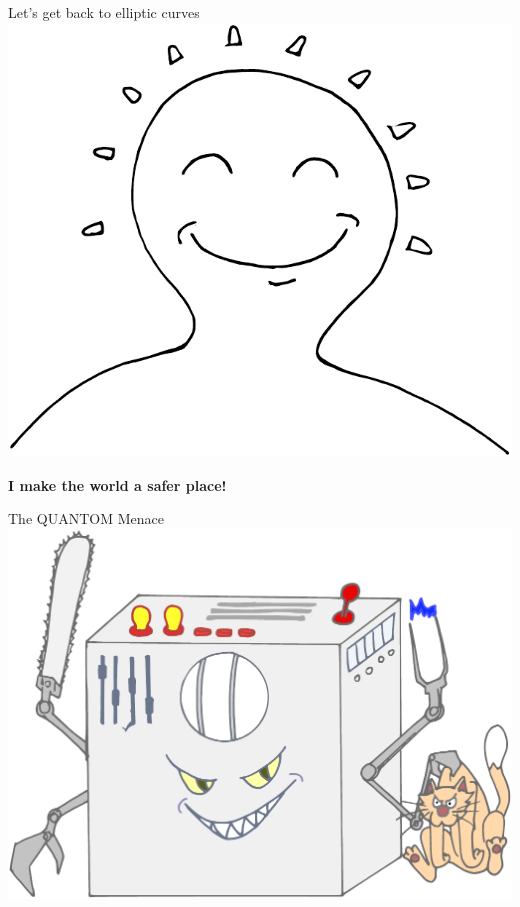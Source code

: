 \documentclass{beamer}
\begin{document}

\begin{frame}{Let's get back to elliptic curves}
  \centering
  \includegraphics[height=0.7\textheight]{ec-happy}
  
  \Large\bf  I make the world a safer place!
\end{frame}


\begin{frame}{The QUANTOM Menace}
  \centering
  \includegraphics[height=0.7\textheight]{qc-color}
\end{frame}
\end{document}
